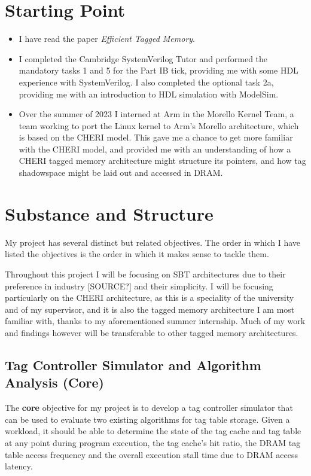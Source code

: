 \documentclass[10pt,a4paper]{article}
\begin{document}
\section*{Starting Point}
\begin{itemize}
	\item I have read the paper \textit{Efficient Tagged Memory}.
	\item I completed the Cambridge SystemVerilog Tutor \cite{sysvertutor} and performed the mandatory tasks 1 and 5 for the Part IB tick, providing me with some HDL experience with SystemVerilog. I also completed the optional task 2a, providing me with an introduction to HDL simulation with ModelSim.
	\item Over the summer of 2023 I interned at Arm in the Morello Kernel Team, a team working to port the Linux kernel to Arm's Morello architecture, which is based on the CHERI model. This gave me a chance to get more familiar with the CHERI model, and provided me with an understanding of how a CHERI tagged memory architecture might structure its pointers, and how tag shadowspace might be laid out and accessed in DRAM.
\end{itemize}

\section*{Substance and Structure}
My project has several distinct but related objectives. The order in which I have listed the objectives is the order in which it makes sense to tackle them.

Throughout this project I will be focusing on SBT architectures due to their preference in industry [SOURCE?] and their simplicity. I will be focusing particularly on the CHERI architecture, as this is a speciality of the university and of my supervisor, and it is also the tagged memory architecture I am most familiar with, thanks to my aforementioned summer internship. Much of my work and findings however will be transferable to other tagged memory architectures.

\subsection*{Tag Controller Simulator and Algorithm Analysis (Core)}
The \textbf{core} objective for my project is to develop a tag controller simulator that can be used to evaluate two existing algorithms for tag table storage. Given a workload, it should be able to determine the state of the tag cache and tag table at any point during program execution, the tag cache's hit ratio, the DRAM tag table access frequency and the overall execution stall time due to DRAM access latency.
\end{document}
